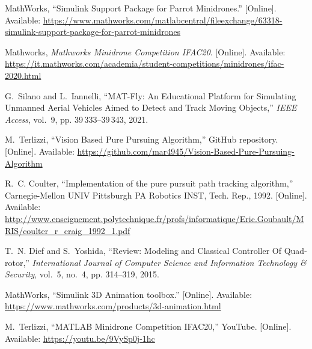\documentclass[a4paper,twocolumn,10pt]{article}
\begin{document}
\begin{thebibliography}{10}
        {MathWorks}, ``{Simulink Support Package for Parrot Minidrones}.'' [Online].
        Available:
        \url{https://www.mathworks.com/matlabcentral/fileexchange/63318-simulink-support-package-for-parrot-minidrones}

        Mathworks, \emph{{Mathworks Minidrone Competition IFAC20}}. [Online].
        Available:
        \url{https://it.mathworks.com/academia/student-competitions/minidrones/ifac-2020.html}

        G.~Silano and L.~Iannelli, ``{MAT-Fly: An Educational Platform for Simulating
        Unmanned Aerial Vehicles Aimed to Detect and Track Moving Objects},''
        \emph{IEEE Access}, vol.~9, pp. 39\,333--39\,343, 2021.

        M.~{Terlizzi}, ``{Vision Based Pure Pursuing Algorithm},'' GitHub repository.
        [Online]. Available:
        \url{https://github.com/mar4945/Vision-Based-Pure-Pursuing-Algorithm}

        R.~C. {Coulter}, ``{Implementation of the pure pursuit path tracking
        algorithm},'' {Carnegie-Mellon UNIV Pittsburgh PA Robotics INST}, Tech. Rep.,
        1992. [Online]. Available:
        \url{http://www.enseignement.polytechnique.fr/profs/informatique/Eric.Goubault/MRIS/coulter_r_craig_1992_1.pdf}

        T.~N. Dief and S.~Yoshida, ``{Review: Modeling and Classical Controller Of
        Quad-rotor},'' \emph{International Journal of Computer Science and
        Information Technology \& Security}, vol.~5, no.~4, pp. 314--319, 2015.

        {MathWorks}, ``{Simulink 3D Animation toolbox}.'' [Online]. Available:
        \url{https://www.mathworks.com/products/3d-animation.html}

        M.~{Terlizzi}, ``{MATLAB Minidrone Competition IFAC20},'' YouTube. [Online].
        Available: \url{https://youtu.be/9VySp0j-1hc}
    \end{thebibliography}
\end{document}
